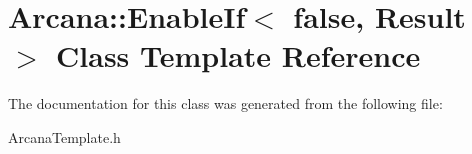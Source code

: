 \hypertarget{class_arcana_1_1_enable_if_3_01false_00_01_result_01_4}{}\section{Arcana\+:\+:Enable\+If$<$ false, Result $>$ Class Template Reference}
\label{class_arcana_1_1_enable_if_3_01false_00_01_result_01_4}


The documentation for this class was generated from the following file\+:\begin{DoxyCompactItemize}
\item 
Arcana\+Template.\+h\end{DoxyCompactItemize}
